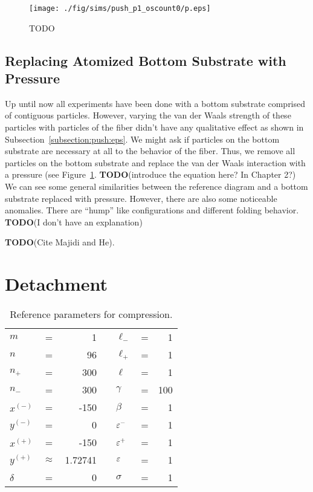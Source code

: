	\begin{figure}
		\begin{center}
			\texttt{[image: ./fig/sims/push\_p1\_oscount0/p.eps]}
		\end{center}		
		\caption{ TODO
		\label{fig:PushGrid:p1}}
	\end{figure}

\subsection{Replacing Atomized Bottom Substrate with Pressure}

Up until now all experiments have been done with a bottom substrate comprised of contiguous particles. However, varying the van der Waals strength of these particles with particles of the fiber didn't have any qualitative effect as shown in Subsection~\ref{subsection:push:eps}. We might ask if particles on the bottom substrate are necessary at all to the behavior of the fiber. Thus, we remove all particles on the bottom substrate and replace the van der Waals interaction with a pressure (see Figure~\ref{fig:PushGrid:p1}. \textbf{TODO}(introduce the equation here? In Chapter 2?) We can see some general similarities between the reference diagram and a bottom substrate replaced with pressure. However, there are also some noticeable anomalies. There are ``hump'' like configurations and different folding behavior. \textbf{TODO}(I don't have an explanation)

\textbf{TODO}(Cite Majidi and He).

\section{Detachment}

	\begin{table}
		\centering
		\caption{Reference parameters for compression. \label{table:detachment_reference}}
		\begin{tabular}{lcrclcr}
			$m$ & = & 1 & \hspace{1in} & $\ell_-$ & = & 1 \\
			$n$ & = & 96 & & $\ell_+$ & = & 1 \\
			$n_+$ & = & 300 & & $\ell$ & = & 1 \\
			$n_-$ & = & 300 & & $\gamma$ & = & 100 \\
			$x^{(-)}$ & = & -150 & & $\beta$ & = & 1 \\
			$y^{(-)}$ & = & 0 & & $\varepsilon^-$ & = & 1 \\
			$x^{(+)}$ & = & -150 & & $\varepsilon^+$ & = & 1 \\
			$y^{(+)}$ & $\approx$ & 1.72741 & & $\varepsilon$ & = & 1 \\
			$\delta$ & = & 0 & & $\sigma$ & = & 1
		\end{tabular}
	\end{table}
	
